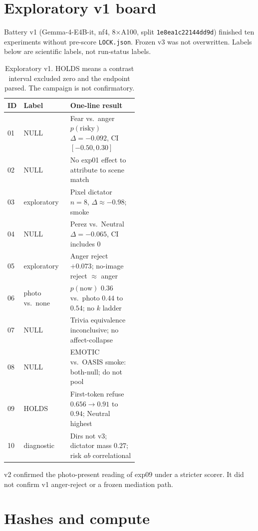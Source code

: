 \documentclass{article}
\begin{document}
\small



\appendix

\section{Exploratory v1 board}
\label{app:v1}

Battery v1 (Gemma-4-E4B-it, nf4, 8$\times$A100, split \texttt{1e8ea1c22144dd9d}) finished ten experiments without pre-score \texttt{LOCK.json}. Frozen v3 was not overwritten. Labels below are scientific labels, not run-status labels.

\begin{table}[h]
\caption{Exploratory v1. HOLDS means a contrast interval excluded zero and the endpoint parsed. The campaign is not confirmatory.}
\label{tab:v1}
\centering
\footnotesize
\begin{tabular}{@{}llp{0.52\linewidth}@{}}
\toprule
ID & Label & One-line result \\
\midrule
01 & NULL & Fear vs.\ anger $p(\mathrm{risky})$ $\Delta=-0.092$, CI $[-0.50,0.30]$ \\
02 & NULL & No exp01 effect to attribute to scene match \\
03 & exploratory & Pixel dictator $n=8$, $\Delta\approx-0.98$; smoke \\
04 & NULL & Perez vs.\ Neutral $\Delta=-0.065$, CI includes $0$ \\
05 & exploratory & Anger reject $+0.073$; no-image reject $\approx$ anger \\
06 & photo vs.\ none & $p(\mathrm{now})$ $0.36$ vs.\ photo $0.44$ to $0.54$; no $k$ ladder \\
07 & NULL & Trivia equivalence inconclusive; no affect-collapse \\
08 & NULL & EMOTIC vs.\ OASIS smoke: both-null; do not pool \\
09 & HOLDS & First-token refuse $0.656\to 0.91$ to $0.94$; Neutral highest \\
10 & diagnostic & Dirs not v3; dictator mass $0.27$; risk $ab$ correlational \\
\bottomrule
\end{tabular}
\end{table}

v2 confirmed the photo-present reading of exp09 under a stricter scorer. It did not confirm v1 anger-reject or a frozen mediation path.

\section{Hashes and compute}
\label{app:hash}
\end{document}
